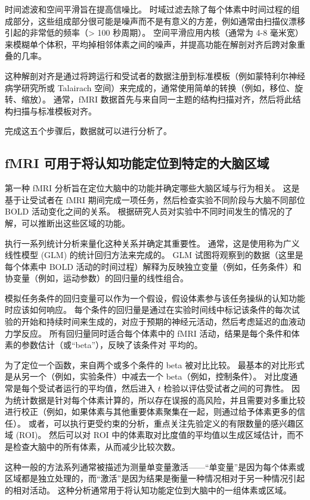 时间滤波和空间平滑旨在提高信噪比。 
时域过滤去除了每个体素中时间过程的组成部分，这些组成部分很可能是噪声而不是有意义的方差，例如通常由扫描仪漂移引起的非常低的频率（> 100 秒周期）。 
空间平滑应用内核（通常为 4-8 毫米宽）来模糊单个体积，平均掉相邻体素之间的噪声，并提高功能在解剖对齐后跨对象重叠的几率。

这种解剖对齐是通过将跨运行和受试者的数据注册到标准模板（例如蒙特利尔神经病学研究所或 Talairach 空间）来完成的，通常使用简单的转换（例如，移位、旋转、缩放）。 
通常，fMRI 数据首先与来自同一主题的结构扫描对齐，然后将此结构扫描与标准模板对齐。

完成这五个步骤后，数据就可以进行分析了。


\subsection{fMRI 可用于将认知功能定位到特定的大脑区域}
第一种 fMRI 分析旨在定位大脑中的功能并确定哪些大脑区域与行为相关。 
这是基于让受试者在 fMRI 期间完成一项任务，然后检查实验不同阶段与大脑不同部位 BOLD 活动变化之间的关系。 
根据研究人员对实验中不同时间发生的情况的了解，可以推断出这些区域的功能。


执行一系列统计分析来量化这种关系并确定其重要性。 
通常，这是使用称为广义线性模型 (GLM) 的统计回归方法来完成的。 
GLM 试图将观察到的数据（这里是每个体素中 BOLD 活动的时间过程）解释为反映独立变量（例如，任务条件）和协变量（例如，运动参数）的回归量的线性组合。


模拟任务条件的回归变量可以作为一个假设，假设体素参与该任务操纵的认知功能时应该如何响应。 
每个条件的回归量是通过在实验时间线中标记该条件的每次试验的开始和持续时间来生成的，对应于预期的神经元活动，然后考虑延迟的血液动力学反应。 
所有回归量同时适合每个体素中的 fMRI 活动，结果是每个条件和体素的参数估计（或“beta”），反映了该条件对 平均的。


为了定位一个函数，来自两个或多个条件的 beta 被对比比较。 
最基本的对比形式是从另一个（例如，实验条件）中减去一个 beta（例如，控制条件）。 
对比度通常是每个受试者运行的平均值，然后进入 $t$ 检验以评估受试者之间的可靠性。 
因为统计数据是针对每个体素计算的，所以存在误报的高风险，并且需要对多重比较进行校正（例如，如果体素与其他重要体素聚集在一起，则通过给予体素更多的信任）。 
或者，可以执行更受约束的分析，重点关注先验定义的有限数量的感兴趣区域 (ROI)。 
然后可以对 ROI 中的体素取对比度值的平均值以生成区域估计，而不是检查大脑中的所有体素，从而减少比较次数。


这种一般的方法系列通常被描述为测量单变量激活——“单变量”是因为每个体素或区域都是独立处理的，而“激活”是因为结果是衡量一种情况相对于另一种情况引起的相对活动。 
这种分析通常用于将认知功能定位到大脑中的一组体素或区域。


